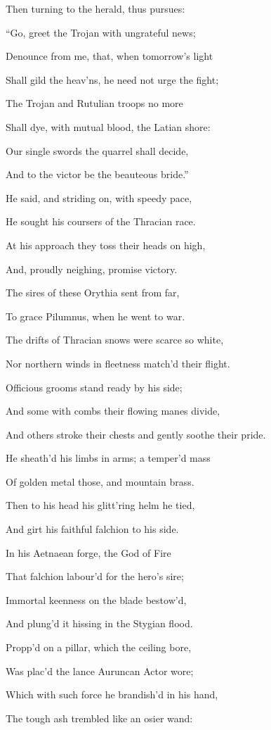Then turning to the herald, thus pursues:

“Go, greet the Trojan with ungrateful news;

Denounce from me, that, when tomorrow’s light

Shall gild the heav’ns, he need not urge the fight;

The Trojan and Rutulian troops no more

Shall dye, with mutual blood, the Latian shore:

Our single swords the quarrel shall decide,

And to the victor be the beauteous bride.”

He said, and striding on, with speedy pace,

He sought his coursers of the Thracian race.

At his approach they toss their heads on high,

And, proudly neighing, promise victory.

The sires of these Orythia sent from far,

To grace Pilumnus, when he went to war.

The drifts of Thracian snows were scarce so white,

Nor northern winds in fleetness match’d their flight.

Officious grooms stand ready by his side;

And some with combs their flowing manes divide,

And others stroke their chests and gently soothe their pride.

He sheath’d his limbs in arms; a temper’d mass

Of golden metal those, and mountain brass.

Then to his head his glitt’ring helm he tied,

And girt his faithful falchion to his side.

In his Aetnaean forge, the God of Fire

That falchion labour’d for the hero’s sire;

Immortal keenness on the blade bestow’d,

And plung’d it hissing in the Stygian flood.

Propp’d on a pillar, which the ceiling bore,

Was plac’d the lance Auruncan Actor wore;

Which with such force he brandish’d in his hand,

The tough ash trembled like an osier wand:

